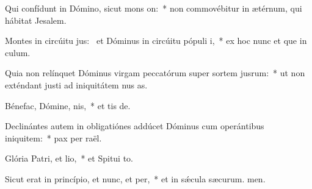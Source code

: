 \item Qui confídunt in Dómino, sicut mons on:~* non commovébitur in ætérnum, qui hábitat  Jesalem.
\item Montes in circúitu jus:~\pscross{} et Dóminus in circúitu pópuli i,~* ex hoc nunc et que in culum.
\item Quia non relínquet Dóminus virgam peccatórum super sortem jusrum:~* ut non exténdant justi ad iniquitátem nus as.
\item Bénefac, Dómine, nis,~* et tis de.
\item Declinántes autem in obligatiónes addúcet Dóminus cum operántibus iniquitem:~* pax per raël.
\item Glória Patri, et lio,~* et Spitui to.
\item Sicut erat in princípio, et nunc, et per,~* et in sǽcula sæcurum. men.
